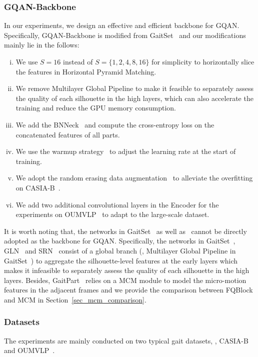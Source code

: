 \subsubsection{GQAN-Backbone}
\label{sec_settings_backbone}
In our experiments, we design an effective and efficient backbone for GQAN.
%
Specifically, GQAN-Backbone is modified from GaitSet~\cite{chao2019gaitset} and our modifications mainly lie in the follows:
\begin{enumerate}[(i)]
	\item We use $S \! = \! 16$ instead of $S \!= \! \{1, 2, 4, 8, 16\}$ for simplicity to horizontally slice the features in Horizontal Pyramid Matching.
	\item We remove Multilayer Global Pipeline to make it feasible to separately assess the quality of each silhouette in the high layers, which can also accelerate the training and reduce the GPU memory consumption.
	\item We add the BNNeck~\cite{luo2019bag} and compute the cross-entropy loss on the concatenated features of all parts.
	\item We use the warmup strategy~\cite{he2016deep} to adjust the learning rate at the start of training.
	\item We adopt the random erasing data augmentation~\cite{zhong2020random} to alleviate the overfitting on CASIA-B~\cite{yu2006framework}.
	\item We add two additional convolutional layers in the Encoder for the experiments on OUMVLP~\cite{takemura2018multi} to adapt to the large-scale dataset.
\end{enumerate}
It is worth noting that, the networks in GaitSet~\cite{chao2019gaitset} as well as~\cite{fan2020gaitpart,hou2020gait,hou2021setres} cannot be directly adopted as the backbone for GQAN.
%
Specifically, the networks in GaitSet~\cite{chao2019gaitset}, GLN~\cite{hou2020gait} and SRN~\cite{hou2021setres} consist of a global branch (\eg, Multilayer Global Pipeline in GaitSet~\cite{chao2019gaitset}) to aggregate the silhouette-level features at the early layers which makes it infeasible to separately assess the quality of each silhouette in the high layers.
%
Besides, GaitPart~\cite{fan2020gaitpart} relies on a MCM module to model the micro-motion features in the adjacent frames and we provide the comparison between FQBlock and MCM in Section~\ref{sec_mcm_comparison}.

\subsubsection{Datasets}
The experiments are mainly conducted on two typical gait datasets, \ie, CASIA-B~\cite{yu2006framework} and OUMVLP~\cite{takemura2018multi}.
%

